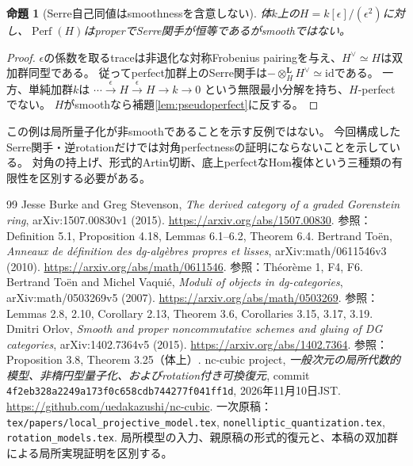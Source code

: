 \documentclass[a4paper,10pt]{ltjsarticle}
\newtheorem{proposition}[theorem]{命題}
\theoremstyle{definition}
\theoremstyle{remark}
\newcommand{\Perf}{\operatorname{Perf}}
\newcommand{\otL}{\otimes^{\mathbf L}}
\begin{document}
\begin{proposition}[Serre自己同値はsmoothnessを含意しない]\label{prop:warning}
体$k$上の$H=k[\epsilon]/(\epsilon^2)$に対し、$\Perf(H)$はproperでSerre関手が恒等であるがsmoothではない。
\end{proposition}
\begin{proof}
$\epsilon$の係数を取るtraceは非退化な対称Frobenius pairingを与え、$H^\vee\simeq H$は双加群同型である。
従ってperfect加群上のSerre関手は$-\otL_HH^\vee\simeq\mathrm{id}$である。
一方、単純加群$k$は
$\cdots\xrightarrow{\epsilon}H\xrightarrow{\epsilon}H\to k\to0$
という無限最小分解を持ち、$H$-perfectでない。
$H$がsmoothなら補題\ref{lem:pseudoperfect}に反する。
\end{proof}

この例は局所量子化が非smoothであることを示す反例ではない。
今回構成したSerre関手・逆rotationだけでは対角perfectnessの証明にならないことを示している。
対角の持上げ、形式的Artin切断、底上perfectなHom複体という三種類の有限性を区別する必要がある。

\begin{thebibliography}{99}
 Jesse Burke and Greg Stevenson,
\emph{The derived category of a graded Gorenstein ring},
arXiv:1507.00830v1 (2015).
\url{https://arxiv.org/abs/1507.00830}.
参照：Definition 5.1, Proposition 4.18, Lemmas 6.1--6.2, Theorem 6.4.
 Bertrand Toën,
\emph{Anneaux de définition des dg-algèbres propres et lisses},
arXiv:math/0611546v3 (2010).
\url{https://arxiv.org/abs/math/0611546}.
参照：Théorème 1, F4, F6.
 Bertrand Toën and Michel Vaquié,
\emph{Moduli of objects in dg-categories},
arXiv:math/0503269v5 (2007).
\url{https://arxiv.org/abs/math/0503269}.
参照：Lemmas 2.8, 2.10, Corollary 2.13, Theorem 3.6, Corollaries 3.15, 3.17, 3.19.
 Dmitri Orlov,
\emph{Smooth and proper noncommutative schemes and gluing of DG categories},
arXiv:1402.7364v5 (2015).
\url{https://arxiv.org/abs/1402.7364}.
参照：Proposition 3.8, Theorem 3.25（体上）.
 nc-cubic project,
\emph{一般次元の局所代数的模型、非楕円型量子化、およびrotation付き可換復元},
commit \texttt{4f2eb328a2249a173f0c658cdb744277f041ff1d}, 2026年11月10日JST.
\url{https://github.com/uedakazushi/nc-cubic}.
一次原稿：\texttt{tex/papers/local\_projective\_model.tex},
\texttt{nonelliptic\_quantization.tex}, \texttt{rotation\_models.tex}.
局所模型の入力、親原稿の形式的復元と、本稿の双加群による局所実現証明を区別する。

\end{thebibliography}
\end{document}
